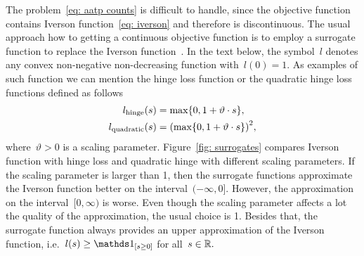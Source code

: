 The problem~\eqref{eq: aatp counts} is difficult to handle, since the objective function contains Iverson function~\eqref{eq: iverson} and therefore is discontinuous. The usual approach how to getting a continuous objective function is to employ a surrogate function to replace the Iverson function~\cite{li2014top, grill2016learning}. In the text below, the symbol~$l$ denotes any convex non-negative non-decreasing function with~$l(0) = 1$. As examples of such function we can mention the hinge loss function or the quadratic hinge loss functions defined as follows
\begin{equation}\label{eq: surrogates}
  \begin{aligned}
    l_{\text{hinge}}(s) & = \max\Brac[c]{0, 1 + \vartheta \cdot s}, \\
    l_{\text{quadratic}}(s) & = \Brac{\max\Brac[c]{0, 1 + \vartheta \cdot s}}^2,\\
  \end{aligned}
\end{equation}
where~$\vartheta > 0$ is a scaling parameter. Figure~\ref{fig: surrogates} compares Iverson function with hinge loss and quadratic hinge with different scaling parameters. If the scaling parameter is larger than 1, then the surrogate functions approximate the Iverson function better on the interval~$(-\infty, 0]$. However, the approximation on the interval~$[0, \infty)$ is worse. Even though the scaling parameter affects a lot the quality of the approximation, the usual choice is 1. Besides that, the surrogate function always provides an upper approximation of the Iverson function, i.e.~$l(s) \ge \Iverson{s \ge 0}$ for all~$s \in \mathbb{R}.$ 

